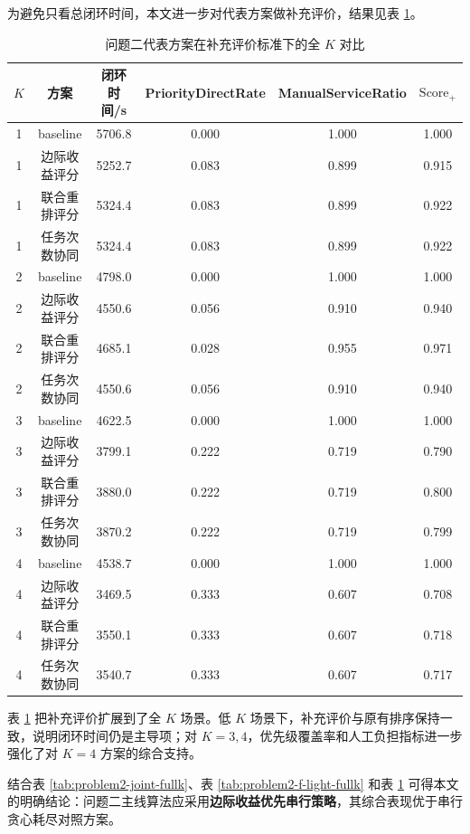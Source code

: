 \documentclass[12pt]{article}
\begin{document}
为避免只看总闭环时间，本文进一步对代表方案做补充评价，结果见表 \ref{tab:problem2-expanded-eval-fullk}。

\begin{table}[H]
\centering
\caption{问题二代表方案在补充评价标准下的全 $K$ 对比}
\label{tab:problem2-expanded-eval-fullk}
\small
\setlength{\tabcolsep}{3.5pt}
\begin{tabular}{cccccc}
\toprule
$K$ & 方案 & 闭环时间/s & PriorityDirectRate & ManualServiceRatio & $\text{Score}_{+}$ \\
\midrule
1 & baseline & 5706.8 & 0.000 & 1.000 & 1.000 \\
1 & 边际收益评分 & 5252.7 & 0.083 & 0.899 & 0.915 \\
1 & 联合重排评分 & 5324.4 & 0.083 & 0.899 & 0.922 \\
1 & 任务次数协同 & 5324.4 & 0.083 & 0.899 & 0.922 \\
2 & baseline & 4798.0 & 0.000 & 1.000 & 1.000 \\
2 & 边际收益评分 & 4550.6 & 0.056 & 0.910 & 0.940 \\
2 & 联合重排评分 & 4685.1 & 0.028 & 0.955 & 0.971 \\
2 & 任务次数协同 & 4550.6 & 0.056 & 0.910 & 0.940 \\
3 & baseline & 4622.5 & 0.000 & 1.000 & 1.000 \\
3 & 边际收益评分 & 3799.1 & 0.222 & 0.719 & 0.790 \\
3 & 联合重排评分 & 3880.0 & 0.222 & 0.719 & 0.800 \\
3 & 任务次数协同 & 3870.2 & 0.222 & 0.719 & 0.799 \\
4 & baseline & 4538.7 & 0.000 & 1.000 & 1.000 \\
4 & 边际收益评分 & 3469.5 & 0.333 & 0.607 & 0.708 \\
4 & 联合重排评分 & 3550.1 & 0.333 & 0.607 & 0.718 \\
4 & 任务次数协同 & 3540.7 & 0.333 & 0.607 & 0.717 \\
\bottomrule
\end{tabular}
\normalsize
\end{table}

表 \ref{tab:problem2-expanded-eval-fullk} 把补充评价扩展到了全 $K$ 场景。低 $K$ 场景下，补充评价与原有排序保持一致，说明闭环时间仍是主导项；对 $K=3,4$，优先级覆盖率和人工负担指标进一步强化了对 $K=4$ 方案的综合支持。

结合表 \ref{tab:problem2-joint-fullk}、表 \ref{tab:problem2-f-light-fullk} 和表 \ref{tab:problem2-expanded-eval-fullk} 可得本文的明确结论：问题二主线算法应采用\textbf{边际收益优先串行策略}，其综合表现优于串行贪心耗尽对照方案。
\end{document}
